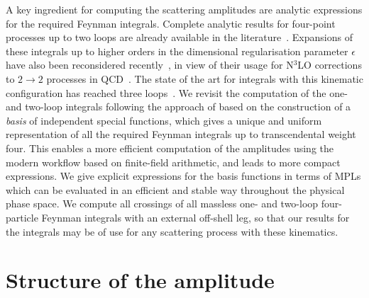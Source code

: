 \documentclass[main.tex]{subfiles}
\begin{document}
A key ingredient for computing the scattering amplitudes are analytic
expressions for the required Feynman integrals.  Complete analytic results for four-point processes up
to two loops are already available in the
literature~\cite{gehrmann:2000zt,gehrmann:2001ck,Gehrmann:2002zr}.  Expansions
of these integrals up to higher orders in the dimensional regularisation
parameter $\epsilon$ have also been reconsidered
recently~\cite{Gehrmann:2023etk}, in view of their usage for N$^3$LO
corrections to $2\to 2$ processes in
QCD~\cite{Gehrmann:2022vuk,Gehrmann:2023zpz}.  The state of the art for
integrals with this kinematic configuration has reached three
loops~\cite{DiVita:2014pza,Canko:2020gqp,Canko:2021xmn,Henn:2023vbd}.  We
revisit the computation of the one- and two-loop integrals following the
approach of
based on the construction of a \emph{basis} of independent special functions,
which gives a unique and uniform representation of all the required Feynman
integrals up to transcendental weight four.  This enables a more efficient
computation of the amplitudes using the modern workflow based on finite-field
arithmetic, and leads to more compact expressions. We give explicit expressions
for the basis functions in terms of MPLs which can be evaluated in an
efficient and stable way throughout the physical phase space.  We compute all
crossings of all massless one- and two-loop four-particle Feynman integrals
with an external off-shell leg, so that our results for the integrals may be of
use for any scattering process with these kinematics.


\section{Structure of the amplitude}
\label{secQED:structure}
\end{document}
